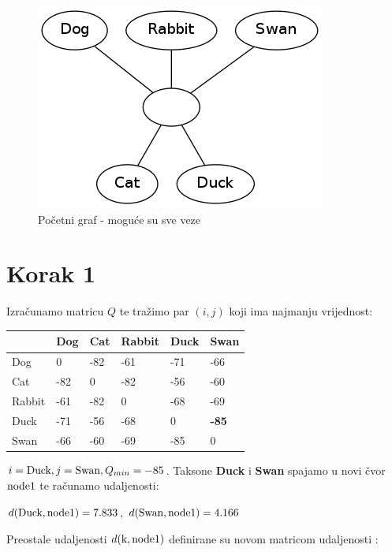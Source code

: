 \documentclass[times, utf8, seminar, numeric]{fer}
\begin{document}
\begin{figure}[htb]
\centering
\includegraphics[scale=0.6]{./img/pocetni.png}
\caption{Početni graf - moguće su sve veze}
\end{figure}

\newpage
\section{Korak 1}
Izračunamo matricu $Q$ te tražimo par $(i,j)$ koji ima najmanju vrijednost:

\begin{table}[h]
	\centering
    \begin{tabular}{|l|l|l|l|l|l|}
    \hline
    ~ & Dog  & Cat  & Rabbit  & Duck  & Swan  \\ \hline
    Dog & 0   & -82 & -61 & -71 & -66 \\ \hline
    Cat & -82 & 0   & -82 & -56 & -60 \\ \hline
    Rabbit & -61 & -82 & 0   & -68 & -69 \\ \hline
    Duck & -71 & -56 & -68 & 0   & \textbf{-85} \\ \hline
    Swan & -66 & -60 & -69 & -85 & 0   \\ \hline
    \end{tabular}
\end{table}

$i = \textup{Duck}, j = \textup{Swan}, Q_{min} = -85$. Taksone \textbf{Duck} i \textbf{Swan} spajamo u novi čvor $\textup{node1}$ te računamo udaljenosti: 

\indent $d(\textup{Duck},\textup{node1}) = 7.833$, \newline
\indent $d(\textup{Swan},\textup{node1}) = 4.166$


Preostale udaljenosti $d(\textup{k},\textup{node1})$ definirane su novom matricom udaljenosti :
\end{document}
